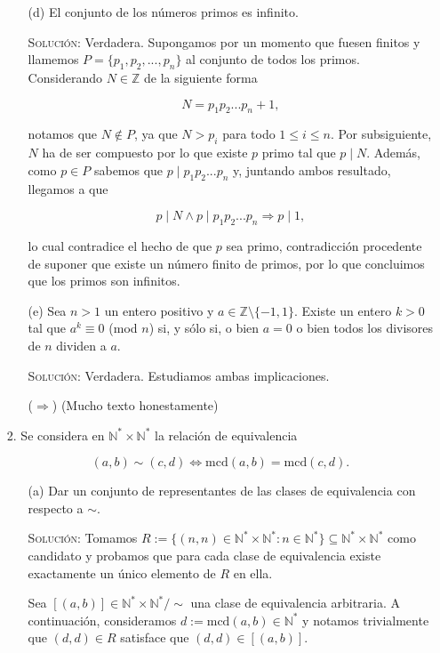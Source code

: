 \documentclass{article}
\begin{document}
\begin{enumerate}
\begin{enumerate}
        \item[(d)] El conjunto de los números primos es infinito.

        \textsc{Solución}: Verdadera. Supongamos por un momento que fuesen finitos y llamemos $P = \{p_1, p_2, ..., p_n\}$ al conjunto de todos los primos. Considerando $N \in \mathbb{Z}$ de la siguiente forma

        \[N = p_1p_2...p_n + 1,\]

        notamos que $N \notin P$, ya que $N > p_i$ para todo $1 \leq i \leq n$. Por subsiguiente, $N$ ha de ser compuesto por lo que existe $p$ primo tal que $p \mid N$. Además, como $p \in P$ sabemos que $p \mid p_1p_2...p_n$ y, juntando ambos resultado, llegamos a que

        \[p \mid N \land p \mid p_1p_2...p_n \Rightarrow p \mid 1,\]

        lo cual contradice el hecho de que $p$ sea primo, contradicción procedente de suponer que existe un número finito de primos, por lo que concluimos que los primos son infinitos.

        \item[(e)] Sea $n > 1$ un entero positivo y $a \in \mathbb{Z} \setminus \{-1, 1\}$. Existe un entero $k > 0$ tal que $a^k \equiv 0$ (mod $n$) si, y sólo si, o bien $a = 0$ o bien todos los divisores de $n$ dividen a $a$.

        \textsc{Solución}: Verdadera. Estudiamos ambas implicaciones.

        ($\Longrightarrow$) (Mucho texto honestamente)
    \end{enumerate}

    \item[2.] Se considera en $\mathbb{N}^* \times \mathbb{N}^{*}$ la relación de equivalencia

    \[(a, b) \sim (c, d) \iff \text{mcd}(a, b) = \text{mcd}(c, d).\]

    \begin{enumerate}
        \item[(a)] Dar un conjunto de representantes de las clases de equivalencia con respecto a $\sim$.

        \textsc{Solución}: Tomamos $R := \{(n, n) \in \mathbb{N}^* \times \mathbb{N}^* : n \in \mathbb{N}^*\} \subseteq \mathbb{N}^* \times \mathbb{N}^*$ como candidato y probamos que para cada clase de equivalencia existe exactamente un único elemento de $R$ en ella.

        Sea $[(a, b)] \in \mathbb{N}^* \times \mathbb{N}^*/\sim$ una clase de equivalencia arbitraria. A continuación, consideramos $d := \text{mcd}(a, b) \in \mathbb{N}^*$ y notamos trivialmente que $(d, d) \in R$ satisface que $(d, d) \in [(a, b)]$.


\end{enumerate}
\end{enumerate}
\end{document}

